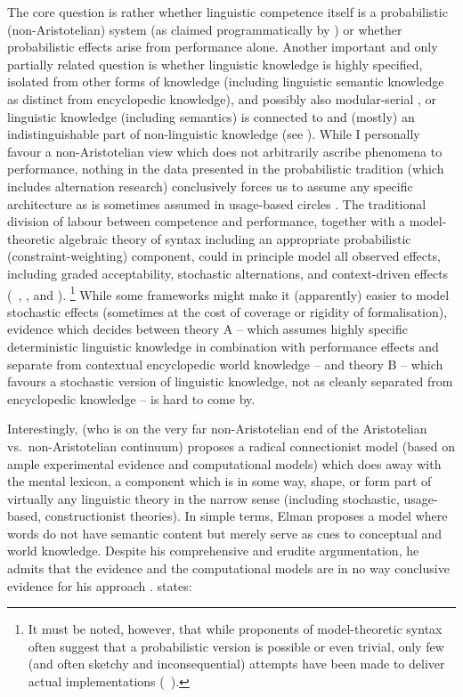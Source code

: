 The core question is rather whether linguistic competence itself is a probabilistic (non-Aristotelian) system (as claimed programmatically by \citealt{Bresnan2007}) or whether probabilistic effects arise from performance alone.%
Another important and only partially related question is whether linguistic knowledge is highly specified, isolated from other forms of knowledge (including linguistic semantic knowledge as distinct from encyclopedic knowledge), and possibly also modular-serial \citep{Fodor1995}, or linguistic knowledge (including semantics) is connected to and (mostly) an indistinguishable part of non-linguistic knowledge (see \citealt{Elman2009}).
While I personally favour a non-Aristotelian view which does not arbitrarily ascribe phenomena to performance, nothing in the data presented in the probabilistic tradition (which includes alternation research) conclusively forces us to assume any specific architecture as is sometimes assumed in usage-based circles \cite{BybeeBeckner2009}.
The traditional division of labour between competence and performance, together with a model-theoretic algebraic theory of syntax including an appropriate probabilistic (constraint-weighting) component, could in principle model all observed effects, including graded acceptability, stochastic alternations, and context-driven effects (\eg\ \citealt[504--507]{Pullum2013}, \citealt{Pullum2013a}, and \citealt[499--500,507--518]{Mueller2018}).%
\footnote{It must be noted, however, that while proponents of model-theoretic syntax often suggest that a probabilistic version is possible \citep[500]{Mueller2018} or even trivial, only few (and often sketchy and inconsequential) attempts have been made to deliver actual implementations (\eg\ \citealt{ArnoldLindarki2007}).}
While some frameworks might make it (apparently) easier to model stochastic effects (sometimes at the cost of coverage or rigidity of formalisation), evidence which decides between theory A -- which assumes highly specific deterministic linguistic knowledge in combination with performance effects and separate from contextual encyclopedic world knowledge -- and theory B -- which favours a stochastic version of linguistic knowledge, not as cleanly separated from encyclopedic knowledge -- is hard to come by.

Interestingly, \citet{Elman2009} (who is on the very far non-Aristotelian end of the Aristotelian vs.\ non-Aristotelian continuum) proposes a radical connectionist model (based on ample experimental evidence and computational models) which does away with the mental lexicon, a component which is in some way, shape, or form part of virtually any linguistic theory in the narrow sense (including stochastic, usage-based, constructionist theories).
In simple terms, Elman proposes a model where words do not have semantic content but merely serve as cues to conceptual and world knowledge.
Despite his comprehensive and erudite argumentation, he admits that the evidence and the computational models are in no way conclusive evidence for his approach \citep[573--574]{Elman2009}.
\citet[573]{Elman2009} states:

